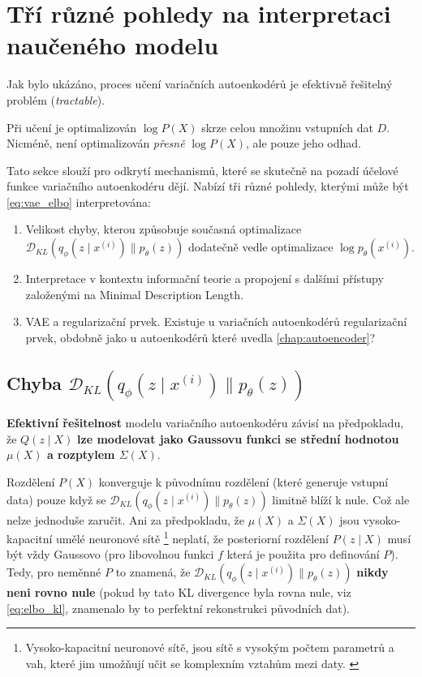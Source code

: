 \section{Tří různé pohledy na interpretaci naučeného modelu}
Jak bylo ukázáno, proces učení variačních autoenkodérů je efektivně řešitelný problém (\emph{tractable}).

Při učení je optimalizován $\log P(X)$ skrze celou množinu vstupních dat $D$. Nicméně, není optimalizován \emph{přesně} $\log P(X)$, ale pouze jeho odhad.

Tato sekce slouží pro odkrytí mechanismů, které se skutečně na pozadí účelové funkce variačního autoenkodéru dějí.
Nabízí tři různé pohledy, kterými může být \autoref{eq:vae_elbo} interpretována:
\begin{enumerate}
    \item Velikost chyby, kterou způsobuje současná optimalizace $\mathcal{D}_{KL}(q_\phi(z\mid x^{(i)})\parallel p_\theta(z))$ dodatečně vedle optimalizace $\log p_\theta(x^{(i)})$.
    \item Interpretace v kontextu informační teorie a propojení s dalšími přístupy založenými na Minimal Description Length.
    \item VAE a regularizační prvek. Existuje u variačních autoenkodérů regularizační prvek, obdobně jako u  autoenkodérů které uvedla \autoref{chap:autoencoder}?
\end{enumerate}

\subsection{Chyba $\mathcal{D}_{KL}(q_\phi(z\mid x^{(i)})\parallel p_\theta(z))$}
\textbf{Efektivní řešitelnost} modelu variačního autoenkodéru závisí na předpokladu,
že $Q(z\mid X)$ \textbf{lze modelovat jako Gaussovu funkci se střední hodnotou $\mu(X)$ a rozptylem $\Sigma(X)$}.

Rozdělení $P(X)$ konverguje k původnímu rozdělení (které generuje vstupní data) pouze když se $\mathcal{D}_{KL}(q_\phi(z\mid x^{(i)})\parallel p_\theta(z))$ limitně blíží k nule.
Což ale nelze jednoduše zaručit. Ani za předpokladu, že $\mu(X)$ a $\Sigma(X)$ jsou vysoko-kapacitní umělé neuronové sítě
\footnote{Vysoko-kapacitní neuronové sítě, jsou sítě s vysokým počtem parametrů a vah, které jim umožňují učit se komplexním vztahům mezi daty. \cite[Kapitola 5]{Goodfellow2016}}
neplatí, že posteriorní rozdělení $P(z\mid X)$ musí být vždy Gaussovo (pro libovolnou funkci $f$ která je použita pro definování $P$).
Tedy, pro neměnné $P$ to znamená, že $\mathcal{D}_{KL}(q_\phi(z\mid x^{(i)})\parallel p_\theta(z))$ \textbf{nikdy neni rovno nule} (pokud by tato KL divergence byla rovna nule, viz \autoref{eq:elbo_kl}, znamenalo by to perfektní rekonstrukci původních dat).

